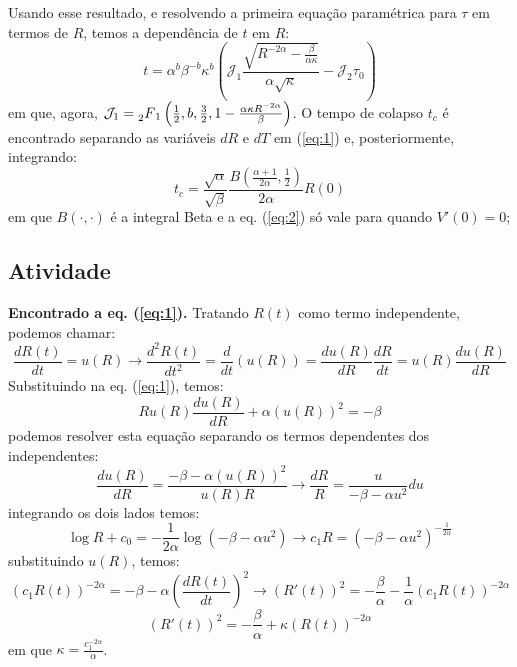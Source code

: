 \documentclass[10pt,a4paper]{article}
\begin{document}
	Usando esse resultado, e resolvendo a primeira equação paramétrica para $\tau$ em termos de $R$, temos a dependência de $t$ em $R$:
	\[t=\alpha^b\beta^{-b}\kappa^b\left(\mathcal{J}_1\frac{\sqrt{R^{-2\alpha}-\frac{\beta}{\alpha\kappa}}}{\alpha\sqrt{\kappa}} - \mathcal{J}_2\tau_0\right)\]
	em que, agora, $\mathcal{J}_1 = \prescript{}{2}{F}_1\left(\frac{1}{2}, b, \frac{3}{2}, 1-\frac{\alpha\kappa R^{-2\alpha}}{\beta}\right)$. O tempo de colapso $t_c$ é encontrado separando as variáveis $dR$ e $dT$ em (\ref{eq:1}) e, posteriormente, integrando:
	\begin{equation}
		t_c=\frac{\sqrt{\alpha}}{\sqrt{\beta}} \frac{B\left(\frac{\alpha+1}{2\alpha},\frac{1}{2}\right)}{2\alpha} R(0)
		\label{eq:2}
	\end{equation}
    em que $B(\cdot,\cdot)$ é a integral Beta e a eq. (\ref{eq:2}) só vale para quando $V'(0)=0$;
    
    \subsection{Atividade}
    \textbf{Encontrado a eq. (\ref{eq:1}).} Tratando $R(t)$ como termo independente, podemos chamar:
    \[\frac{dR(t)}{dt} = u(R) \rightarrow \frac{d^2R(t)}{dt^2} = \frac{d}{dt}\left(u(R)\right) = \frac{du(R)}{dR}\frac{dR}{dt} = u(R)\frac{du(R)}{dR}\]
    Substituindo na eq. (\ref{eq:1}), temos:
    \[Ru(R)\frac{du(R)}{dR} + \alpha(u(R))^2 = -\beta\]
    podemos resolver esta equação separando os termos dependentes dos independentes:
    \[\frac{du(R)}{dR} = \frac{-\beta-\alpha(u(R))^2}{u(R)R} \rightarrow \frac{dR}{R} = \frac{u}{-\beta-\alpha u^2}du\]
    integrando os dois lados temos:
    \[\log{R} + c_0 = -\frac{1}{2\alpha}\log{\left(-\beta-\alpha u^2\right)} \rightarrow c_1 R = \left(-\beta-\alpha u^2\right)^{-\frac{1}{2\alpha}}\]
    substituindo $u(R)$, temos:
    \[\left(c_1 R(t)\right)^{-2\alpha} = -\beta-\alpha \left(\frac{dR(t)}{dt}\right)^2 \rightarrow (R'(t))^2 = -\frac{\beta}{\alpha} - \frac{1}{\alpha}(c_1R(t))^{-2\alpha}\]
    \[(R'(t))^2 = -\frac{\beta}{\alpha} + \kappa(R(t))^{-2\alpha}\]
    em que $\kappa = \frac{c_1^{-2\alpha}}{\alpha}$.
    
\end{document}
